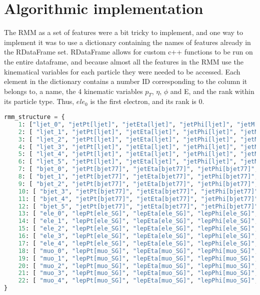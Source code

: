 \section{Algorithmic implementation}\label{sec:algo_impl}

The RMM as a set of features were a bit tricky to implement, and one way to implement it was 
to use a dictionary containing the names of features already in the RDataFrame set. RDataFrame 
allows for custom c++ functions to be run on the entire dataframe, and because almost all the 
features in the RMM use the kinematical variables for each particle they were needed to 
be accessed. Each element in the dictionary contains a number ID corresponding to the column 
it belongs to, a name, the 4 kinematic variables $p_T$, $\eta$, $\phi$ and E, and the rank 
within its particle type. Thus, $ele_0$ is the first electron, and its rank is 0. 

\begin{lstlisting}[language=Python, style=pythonstyle, label={code:rmm_dict_struct}]
rmm_structure = {
    1: ["ljet_0", "jetPt[ljet]", "jetEta[ljet]", "jetPhi[ljet]", "jetM[ljet]", 0,],
    2: [ "ljet_1", "jetPt[ljet]", "jetEta[ljet]", "jetPhi[ljet]", "jetM[ljet]", 1,],
    3: [ "ljet_2", "jetPt[ljet]", "jetEta[ljet]", "jetPhi[ljet]", "jetM[ljet]", 2,],
    4: [ "ljet_3", "jetPt[ljet]", "jetEta[ljet]", "jetPhi[ljet]", "jetM[ljet]", 3,],
    5: [ "ljet_4", "jetPt[ljet]", "jetEta[ljet]", "jetPhi[ljet]", "jetM[ljet]", 4,],
    6: [ "ljet_5", "jetPt[ljet]", "jetEta[ljet]", "jetPhi[ljet]", "jetM[ljet]", 5,],
    7: [ "bjet_0", "jetPt[bjet77]", "jetEta[bjet77]", "jetPhi[bjet77]", "jetM[bjet77]", 0,],
    8: [ "bjet_1", "jetPt[bjet77]", "jetEta[bjet77]", "jetPhi[bjet77]", "jetM[bjet77]", 1,],
    9: [ "bjet_2", "jetPt[bjet77]", "jetEta[bjet77]", "jetPhi[bjet77]", "jetM[bjet77]", 2,],
    10: [ "bjet_3", "jetPt[bjet77]", "jetEta[bjet77]", "jetPhi[bjet77]", "jetM[bjet77]", 3,],
    11: [ "bjet_4", "jetPt[bjet77]", "jetEta[bjet77]", "jetPhi[bjet77]", "jetM[bjet77]", 4,],
    12: [ "bjet_5", "jetPt[bjet77]", "jetEta[bjet77]", "jetPhi[bjet77]", "jetM[bjet77]", 5,],
    13: [ "ele_0", "lepPt[ele_SG]", "lepEta[ele_SG]", "lepPhi[ele_SG]", "lepM[ele_SG]", 0,],
    14: [ "ele_1", "lepPt[ele_SG]", "lepEta[ele_SG]", "lepPhi[ele_SG]", "lepM[ele_SG]", 1,],
    15: [ "ele_2", "lepPt[ele_SG]", "lepEta[ele_SG]", "lepPhi[ele_SG]", "lepM[ele_SG]", 2,],
    16: [ "ele_3", "lepPt[ele_SG]", "lepEta[ele_SG]", "lepPhi[ele_SG]", "lepM[ele_SG]", 3,],
    17: [ "ele_4", "lepPt[ele_SG]", "lepEta[ele_SG]", "lepPhi[ele_SG]", "lepM[ele_SG]", 4,],
    18: [ "muo_0", "lepPt[muo_SG]", "lepEta[muo_SG]", "lepPhi[muo_SG]", "lepM[muo_SG]", 0,],
    19: [ "muo_1", "lepPt[muo_SG]", "lepEta[muo_SG]", "lepPhi[muo_SG]", "lepM[muo_SG]", 1,],
    20: [ "muo_2", "lepPt[muo_SG]", "lepEta[muo_SG]", "lepPhi[muo_SG]", "lepM[muo_SG]", 2,],
    21: [ "muo_3", "lepPt[muo_SG]", "lepEta[muo_SG]", "lepPhi[muo_SG]", "lepM[muo_SG]", 3,],
    22: [ "muo_4", "lepPt[muo_SG]", "lepEta[muo_SG]", "lepPhi[muo_SG]", "lepM[muo_SG]", 4,],
}      

\end{lstlisting}
 
